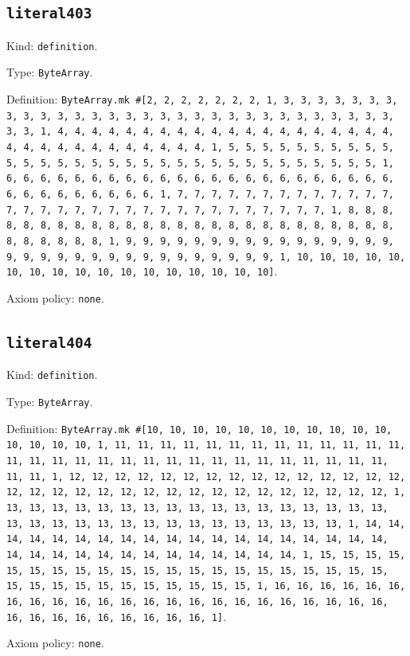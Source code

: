 \documentclass[11pt]{article}
\begin{document}
\subsection*{\texttt{literal403}}
\noindent Kind: \texttt{definition}.\par
\noindent Type: \texttt{ByteArray}.\par
\noindent Definition: \texttt{ByteArray.mk \#[2, 2, 2, 2, 2, 2, 2, 1, 3, 3, 3, 3, 3, 3, 3, 3, 3, 3, 3, 3, 3, 3, 3, 3, 3, 3, 3, 3, 3, 3, 3, 3, 3, 3, 3, 3, 3, 3, 3, 3, 1, 4, 4, 4, 4, 4, 4, 4, 4, 4, 4, 4, 4, 4, 4, 4, 4, 4, 4, 4, 4, 4, 4, 4, 4, 4, 4, 4, 4, 4, 4, 4, 4, 1, 5, 5, 5, 5, 5, 5, 5, 5, 5, 5, 5, 5, 5, 5, 5, 5, 5, 5, 5, 5, 5, 5, 5, 5, 5, 5, 5, 5, 5, 5, 5, 5, 1, 6, 6, 6, 6, 6, 6, 6, 6, 6, 6, 6, 6, 6, 6, 6, 6, 6, 6, 6, 6, 6, 6, 6, 6, 6, 6, 6, 6, 6, 6, 6, 6, 1, 7, 7, 7, 7, 7, 7, 7, 7, 7, 7, 7, 7, 7, 7, 7, 7, 7, 7, 7, 7, 7, 7, 7, 7, 7, 7, 7, 7, 7, 7, 7, 7, 1, 8, 8, 8, 8, 8, 8, 8, 8, 8, 8, 8, 8, 8, 8, 8, 8, 8, 8, 8, 8, 8, 8, 8, 8, 8, 8, 8, 8, 8, 8, 8, 8, 1, 9, 9, 9, 9, 9, 9, 9, 9, 9, 9, 9, 9, 9, 9, 9, 9, 9, 9, 9, 9, 9, 9, 9, 9, 9, 9, 9, 9, 9, 9, 9, 9, 1, 10, 10, 10, 10, 10, 10, 10, 10, 10, 10, 10, 10, 10, 10, 10, 10, 10]}.\par
\noindent Axiom policy: \texttt{none}.\par
\subsection*{\texttt{literal404}}
\noindent Kind: \texttt{definition}.\par
\noindent Type: \texttt{ByteArray}.\par
\noindent Definition: \texttt{ByteArray.mk \#[10, 10, 10, 10, 10, 10, 10, 10, 10, 10, 10, 10, 10, 10, 10, 1, 11, 11, 11, 11, 11, 11, 11, 11, 11, 11, 11, 11, 11, 11, 11, 11, 11, 11, 11, 11, 11, 11, 11, 11, 11, 11, 11, 11, 11, 11, 11, 11, 1, 12, 12, 12, 12, 12, 12, 12, 12, 12, 12, 12, 12, 12, 12, 12, 12, 12, 12, 12, 12, 12, 12, 12, 12, 12, 12, 12, 12, 12, 12, 12, 12, 1, 13, 13, 13, 13, 13, 13, 13, 13, 13, 13, 13, 13, 13, 13, 13, 13, 13, 13, 13, 13, 13, 13, 13, 13, 13, 13, 13, 13, 13, 13, 13, 13, 1, 14, 14, 14, 14, 14, 14, 14, 14, 14, 14, 14, 14, 14, 14, 14, 14, 14, 14, 14, 14, 14, 14, 14, 14, 14, 14, 14, 14, 14, 14, 14, 14, 1, 15, 15, 15, 15, 15, 15, 15, 15, 15, 15, 15, 15, 15, 15, 15, 15, 15, 15, 15, 15, 15, 15, 15, 15, 15, 15, 15, 15, 15, 15, 15, 15, 1, 16, 16, 16, 16, 16, 16, 16, 16, 16, 16, 16, 16, 16, 16, 16, 16, 16, 16, 16, 16, 16, 16, 16, 16, 16, 16, 16, 16, 16, 16, 16, 16, 1]}.\par
\noindent Axiom policy: \texttt{none}.\par
\end{document}
